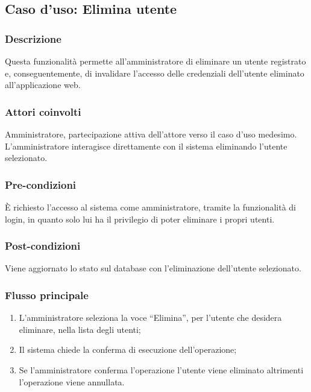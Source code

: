 %
%
\subsection{Caso d'uso: Elimina utente}

\subsubsection*{Descrizione}
Questa funzionalità permette all'amministratore di eliminare un utente registrato e, conseguentemente, di invalidare l'accesso delle credenziali dell'utente eliminato all'applicazione web.

\subsubsection*{Attori coinvolti}
Amministratore, partecipazione attiva dell'attore verso il caso d'uso medesimo.
L'amministratore interagisce direttamente con il sistema eliminando l'utente selezionato.

\subsubsection*{Pre-condizioni}
È richiesto l'accesso al sistema come amministratore, tramite la funzionalità di login, in quanto solo lui ha il privilegio di poter eliminare i propri utenti.

\subsubsection*{Post-condizioni}
Viene aggiornato lo stato sul database con l'eliminazione dell'utente selezionato.

\subsubsection*{Flusso principale}

\begin{enumerate}
	
	\item
	L'amministratore seleziona la voce ``Elimina'', per l'utente che desidera eliminare, nella lista degli utenti;
	
	\item
	Il sistema chiede la conferma di esecuzione dell'operazione;
	
	\item
	Se l'amministratore conferma l'operazione l'utente viene eliminato altrimenti l'operazione viene annullata.
	
\end{enumerate}

